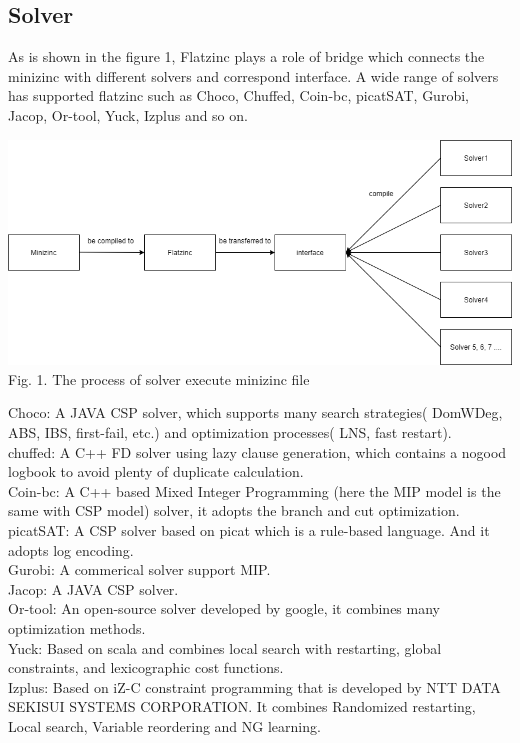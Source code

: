 \subsection{Solver}
As is shown in the figure 1, Flatzinc plays a role of bridge which connects the minizinc with different solvers and correspond interface. A wide range of solvers has supported flatzinc such as Choco, Chuffed, Coin-bc, picatSAT, Gurobi, Jacop, Or-tool, Yuck, Izplus and so on.
\begin{center}
\includegraphics[scale=0.45]{figs/flowofminizinc.png}\\
Fig. 1. The process of solver execute minizinc file
\end{center}
Choco: A JAVA CSP solver, which supports many search strategies( DomWDeg, ABS, IBS, first-fail, etc.) and optimization processes( LNS, fast restart).\\
chuffed: A C++ FD solver using lazy clause generation, which contains a nogood logbook to avoid plenty of duplicate calculation.\\
Coin-bc: A C++ based Mixed Integer Programming (here the MIP model is the same with CSP model) solver, it adopts the branch and cut optimization.\\
picatSAT: A CSP solver based on picat which is a rule-based language. And it adopts log encoding\cite{r8}.\\
Gurobi: A commerical solver support MIP.\\
Jacop: A JAVA CSP solver.\\
Or-tool: An open-source solver developed by google, it combines many optimization methods.\\
Yuck: Based on scala and combines local search with restarting, global constraints, and lexicographic cost functions.\\
Izplus: Based on iZ-C constraint programming that is developed by NTT DATA SEKISUI SYSTEMS CORPORATION. It combines Randomized restarting, Local search, Variable reordering and NG learning.

